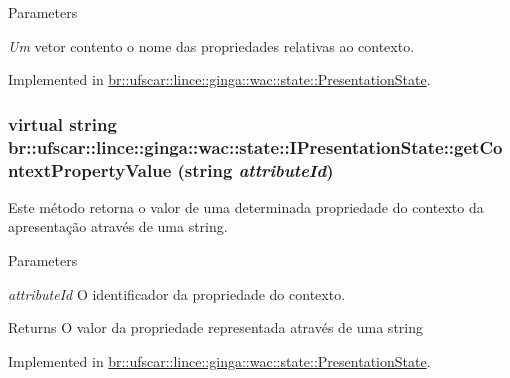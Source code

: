 \begin{DoxyParams}{Parameters}
\item[{\em Um}]vetor contento o nome das propriedades relativas ao contexto. \end{DoxyParams}


Implemented in \hyperlink{classbr_1_1ufscar_1_1lince_1_1ginga_1_1wac_1_1state_1_1PresentationState_ab5f9e22342f390d01e54ca51f8a85609}{br::ufscar::lince::ginga::wac::state::PresentationState}.

\hypertarget{classbr_1_1ufscar_1_1lince_1_1ginga_1_1wac_1_1state_1_1IPresentationState_a3d16c8c6c2c90ef84313414072d953cf}{
\subsubsection[{getContextPropertyValue}]{\setlength{\rightskip}{0pt plus 5cm}virtual string br::ufscar::lince::ginga::wac::state::IPresentationState::getContextPropertyValue (string {\em attributeId})}}
\label{classbr_1_1ufscar_1_1lince_1_1ginga_1_1wac_1_1state_1_1IPresentationState_a3d16c8c6c2c90ef84313414072d953cf}


Este método retorna o valor de uma determinada propriedade do contexto da apresentação através de uma string. 


\begin{DoxyParams}{Parameters}
\item[{\em attributeId}]O identificador da propriedade do contexto. \end{DoxyParams}
\begin{DoxyReturn}{Returns}
O valor da propriedade representada através de uma string 
\end{DoxyReturn}


Implemented in \hyperlink{classbr_1_1ufscar_1_1lince_1_1ginga_1_1wac_1_1state_1_1PresentationState_a2931ba17e6dcd1352382fee289352f4b}{br::ufscar::lince::ginga::wac::state::PresentationState}.

